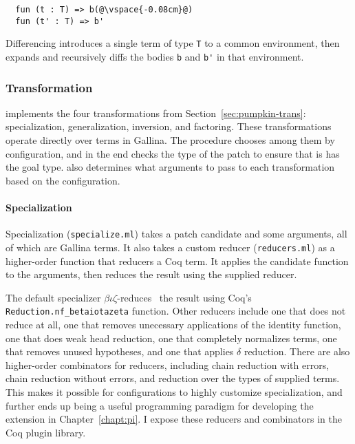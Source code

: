 \begin{lstlisting}
  fun (t : T) => b(@\vspace{-0.08cm}@)
  fun (t' : T) => b'
\end{lstlisting}
Differencing introduces a single term of type \lstinline{T} to a common environment,
then expands and recursively diffs the bodies \lstinline{b} and \lstinline{b'} in that environment.

\subsubsection{Transformation}
\label{sec:pumpkin-impl-trans}

\sysname implements the four transformations from Section~\ref{sec:pumpkin-trans}:
specialization, generalization, inversion, and factoring.
These transformations operate directly over terms in Gallina.
The \sysname procedure chooses among them by configuration,
and in the end checks the type of the patch to ensure that is has the goal type.
\sysname also determines what arguments to pass to each transformation based on the configuration.

\paragraph{Specialization} Specialization (\lstinline{specialize.ml}) takes a patch candidate and some arguments,
all of which are Gallina terms.
It also takes a custom reducer (\lstinline{reducers.ml}) %
as a higher-order function that reducers a Coq term.
It applies the candidate function to the arguments, then reduces the result using the supplied reducer.

The default specializer $\beta\iota\zeta$-reduces~\cite{equality} the result using Coq's
\lstinline{Reduction.nf_betaiotazeta} function. %
Other reducers include one that does not reduce at all, one that removes unecessary applications of the identity function, 
one that does weak head reduction, one that completely normalizes terms, one that removes unused hypotheses,
and one that applies $\delta$ reduction.
There are also higher-order combinators for reducers,
including chain reduction with errors, chain reduction without errors, and reduction over the types of supplied terms.
This makes it possible for configurations to highly customize specialization,
and further ends up being a useful programming paradigm for developing the \toolnamec extension in Chapter~\ref{chapt:pi}.
I expose these reducers and combinators in the Coq plugin library. %


